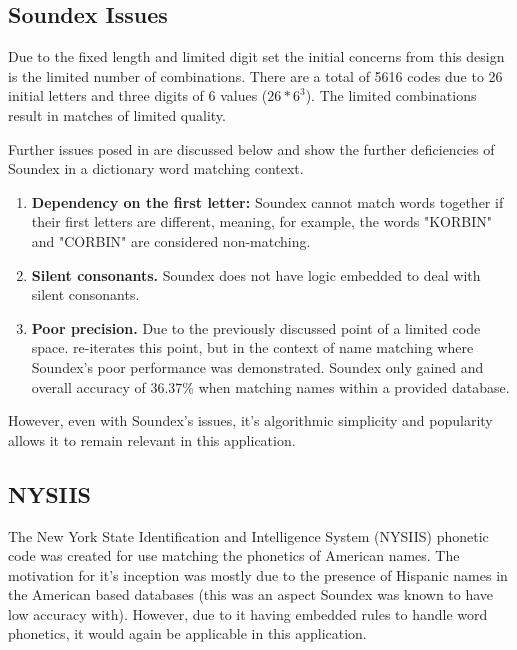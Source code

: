 \subsection*{Soundex Issues}
\label{sec:soundexIssues}

Due to the fixed length and limited digit set the initial concerns from this design is the limited number of combinations. There are a total of 5616 codes due to 26 initial letters and three digits of 6 values ($26 * 6^3$).
The limited combinations result in matches of limited quality.

Further issues posed in \cite{patman2001soundex} are discussed below and show the further deficiencies of Soundex in a dictionary word matching context. 

\begin{enumerate}
    \item \textbf{Dependency on the first letter:} Soundex cannot match words together if their first letters are different, meaning, for example, the words "KORBIN" and "CORBIN" are considered non-matching. 

    \item \textbf{Silent consonants.} Soundex does not have logic embedded to deal with silent consonants.

    \item \textbf{Poor precision.} Due to the previously discussed point of a limited code space. \cite{patman2001soundex} re-iterates this point, but in the context of name matching where Soundex's poor performance was demonstrated. Soundex only gained and overall accuracy of 36.37\% when matching names within a provided database.
\end{enumerate}

However, even with Soundex's issues, it's algorithmic simplicity and popularity allows it to remain relevant in this application.

\subsection{NYSIIS}
The New York State Identification and Intelligence System (NYSIIS) phonetic code was created for use matching the phonetics of American names. The motivation for it's inception was mostly due to the presence of Hispanic names in the American based databases (this was an aspect Soundex was known to have low accuracy with). However, due to it having embedded rules to handle word phonetics, it would again be applicable in this application.

